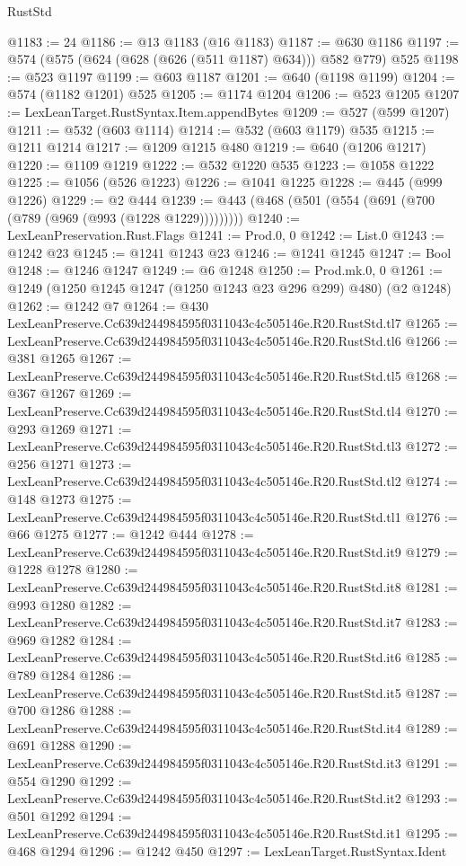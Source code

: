 \begin{lexlean}{RustStd}
\begin{coremodule}
@1183 := 24
@1186 := @13 @1183 (@16 @1183)
@1187 := @630 @1186
@1197 := @574 (@575 (@624 (@628 (@626 (@511 @1187) @634))) @582 @779) @525
@1198 := @523 @1197
@1199 := @603 @1187
@1201 := @640 (@1198 @1199)
@1204 := @574 (@1182 @1201) @525
@1205 := @1174 @1204
@1206 := @523 @1205
@1207 := LexLeanTarget.RustSyntax.Item.appendBytes
@1209 := @527 (@599 @1207)
@1211 := @532 (@603 @1114)
@1214 := @532 (@603 @1179) @535
@1215 := @1211 @1214
@1217 := @1209 @1215 @480
@1219 := @640 (@1206 @1217)
@1220 := @1109 @1219
@1222 := @532 @1220 @535
@1223 := @1058 @1222
@1225 := @1056 (@526 @1223)
@1226 := @1041 @1225
@1228 := @445 (@999 @1226)
@1229 := @2 @444
@1239 := @443 (@468 (@501 (@554 (@691 (@700 (@789 (@969 (@993 (@1228 @1229)))))))))
@1240 := LexLeanPreservation.Rust.Flags
@1241 := Prod.{0, 0}
@1242 := List.{0}
@1243 := @1242 @23
@1245 := @1241 @1243 @23
@1246 := @1241 @1245
@1247 := Bool
@1248 := @1246 @1247
@1249 := @6 @1248
@1250 := Prod.mk.{0, 0}
@1261 := @1249 (@1250 @1245 @1247 (@1250 @1243 @23 @296 @299) @480) (@2 @1248)
@1262 := @1242 @7
@1264 := @430 LexLeanPreserve.Cc639d244984595f0311043c4c505146e.R20.RustStd.tl7
@1265 := LexLeanPreserve.Cc639d244984595f0311043c4c505146e.R20.RustStd.tl6
@1266 := @381 @1265
@1267 := LexLeanPreserve.Cc639d244984595f0311043c4c505146e.R20.RustStd.tl5
@1268 := @367 @1267
@1269 := LexLeanPreserve.Cc639d244984595f0311043c4c505146e.R20.RustStd.tl4
@1270 := @293 @1269
@1271 := LexLeanPreserve.Cc639d244984595f0311043c4c505146e.R20.RustStd.tl3
@1272 := @256 @1271
@1273 := LexLeanPreserve.Cc639d244984595f0311043c4c505146e.R20.RustStd.tl2
@1274 := @148 @1273
@1275 := LexLeanPreserve.Cc639d244984595f0311043c4c505146e.R20.RustStd.tl1
@1276 := @66 @1275
@1277 := @1242 @444
@1278 := LexLeanPreserve.Cc639d244984595f0311043c4c505146e.R20.RustStd.it9
@1279 := @1228 @1278
@1280 := LexLeanPreserve.Cc639d244984595f0311043c4c505146e.R20.RustStd.it8
@1281 := @993 @1280
@1282 := LexLeanPreserve.Cc639d244984595f0311043c4c505146e.R20.RustStd.it7
@1283 := @969 @1282
@1284 := LexLeanPreserve.Cc639d244984595f0311043c4c505146e.R20.RustStd.it6
@1285 := @789 @1284
@1286 := LexLeanPreserve.Cc639d244984595f0311043c4c505146e.R20.RustStd.it5
@1287 := @700 @1286
@1288 := LexLeanPreserve.Cc639d244984595f0311043c4c505146e.R20.RustStd.it4
@1289 := @691 @1288
@1290 := LexLeanPreserve.Cc639d244984595f0311043c4c505146e.R20.RustStd.it3
@1291 := @554 @1290
@1292 := LexLeanPreserve.Cc639d244984595f0311043c4c505146e.R20.RustStd.it2
@1293 := @501 @1292
@1294 := LexLeanPreserve.Cc639d244984595f0311043c4c505146e.R20.RustStd.it1
@1295 := @468 @1294
@1296 := @1242 @450
@1297 := LexLeanTarget.RustSyntax.Ident

\end{coremodule}
\end{lexlean}
